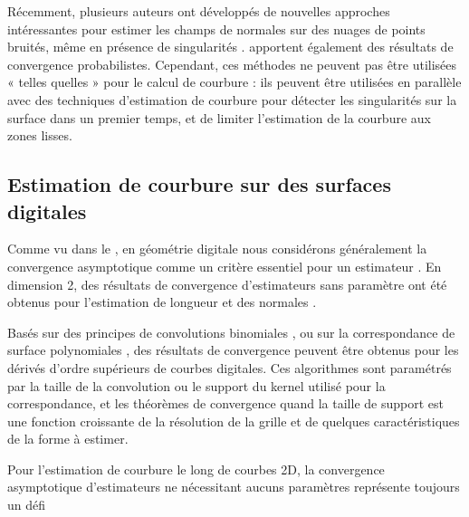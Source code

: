 Récemment, plusieurs auteurs ont développés de nouvelles approches intéressantes
pour estimer les champs de normales sur des nuages de points bruités, même en
présence de singularités \cite{Li2010, Boulch2012, Zhang2013}.
 apportent également des résultats de convergence
probabilistes. Cependant, ces méthodes ne peuvent pas être utilisées « telles
quelles » pour le calcul de courbure : ils peuvent être utilisées en parallèle
avec des techniques d'estimation de courbure pour détecter les singularités sur
la surface dans un premier temps, et de limiter l'estimation de la courbure aux
zones lisses.

\subsection{Estimation de courbure sur des surfaces digitales}

Comme vu dans le , en géométrie digitale nous
considérons généralement la convergence asymptotique comme un critère essentiel
pour un estimateur \cite{Coeurjolly_ChapEstimateur}. En dimension 2, des
résultats de convergence d'estimateurs sans paramètre ont été obtenus pour
l'estimation de longueur \cite{Coeurjolly2004} et des normales
\cite{deVieilleville2007}.

Basés sur des principes de convolutions binomiales
\cite{Malgouyres2008,Esbelin2011}, ou sur la correspondance de surface
polynomiales \cite{Provot2011}, des résultats de convergence peuvent être obtenus
pour les dérivés d'ordre supérieurs de courbes digitales. Ces algorithmes sont
paramétrés par la taille de la convolution ou le support du kernel utilisé
pour la correspondance, et les théorèmes de convergence  quand la taille de support est une fonction
croissante de la résolution de la grille et de quelques caractéristiques de la
forme à estimer.

Pour l'estimation de courbure le long de courbes 2D, la convergence asymptotique
d'estimateurs ne nécessitant aucuns paramètres représente toujours un défi
%

